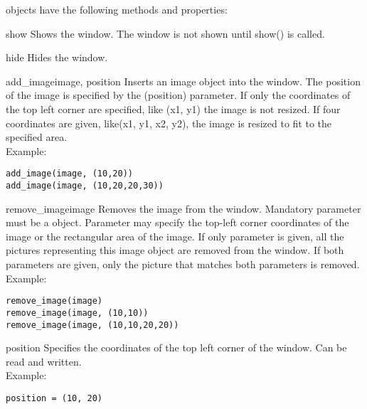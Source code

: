  objects have the following methods and properties:

\begin{methoddesc}[TopWindow]{show}{}
Shows the window. The window is not shown until show() is called.
\end{methoddesc}

\begin{methoddesc}[TopWindow]{hide}{}
Hides the window.
\end{methoddesc}

\begin{methoddesc}[TopWindow]{add_image}{image, position}
Inserts an image object  into the window. The position 
of the image is specified by the \var(position) parameter. 
If only the coordinates of the top left corner are specified, like (x1, y1) 
the image is not resized. If four coordinates are given, like(x1, y1, x2, y2), 
the image is resized to fit to the specified area.
\\Example:
\begin{verbatim} 
add_image(image, (10,20))
add_image(image, (10,20,20,30))
\end{verbatim}
\end{methoddesc}

\begin{methoddesc}[TopWindow]{remove_image}{image}
Removes the image from the window.
Mandatory parameter  must be a  object. 
Parameter  may specify the top-left corner coordinates of the 
image or the rectangular area of the image. If only  parameter is 
given, all the pictures representing this image object are removed from the
window. If both parameters are given, only the picture that matches both 
parameters is removed.
\\Example:
\begin{verbatim}
remove_image(image)
remove_image(image, (10,10))
remove_image(image, (10,10,20,20))
\end{verbatim}
\end{methoddesc}

\begin{memberdesc}[TopWindow]{position}
Specifies the coordinates of the top left corner of the window. Can be read and written.
\\Example: 
\begin{verbatim}
position = (10, 20)
\end{verbatim}
\end{memberdesc}

